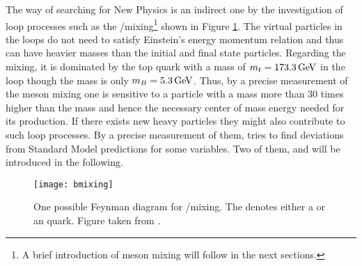 The \lhcb way of searching for New Physics is an indirect one by the investigation of loop processes such as the \B/\Bbar mixing\footnote{A brief introduction of meson mixing will follow in the next sections.} shown in Figure \ref{fig:Bmixing}.
The virtual particles in the loops do not need to satisfy Einstein's energy momentum relation and thus can have heavier masses than the initial and final state particles.
Regarding the \B mixing, it is dominated by the top quark with a mass of $m_t = 173.3 \mathrm{\,Ge\kern -0.1em V}$ in the loop though the \B mass is only $m_{B} = 5.3\mathrm{\,Ge\kern -0.1em V}$.
Thus, by a precise measurement of the \B meson mixing one is sensitive to a particle with a mass more than 30 times higher than the \B mass and hence the necessary center of mass energy needed for its production.
If there exists new heavy particles they might also contribute to such loop processes.
By a precise measurement of them, \lhcb tries to find deviations from Standard Model predictions for some variables.
Two of them, \asld and \Vub will be introduced in the following.
\begin{figure}[ptb]
    \centering
	\texttt{[image: bmixing]}	
	\caption{One possible Feynman diagram for \B/\Bbar mixing. The \quark denotes either a \dquark or an \squark quark. Figure taken from \cite{LHCb_roadmap}.}
	\label{fig:Bmixing}
\end{figure}

